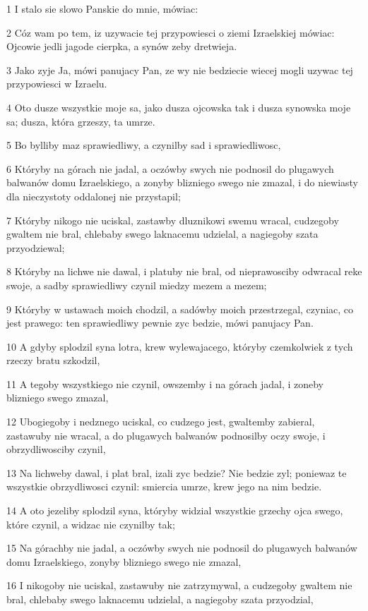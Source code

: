 \par 1 I stalo sie slowo Panskie do mnie, mówiac:
\par 2 Cóz wam po tem, iz uzywacie tej przypowiesci o ziemi Izraelskiej mówiac: Ojcowie jedli jagode cierpka, a synów zeby dretwieja.
\par 3 Jako zyje Ja, mówi panujacy Pan, ze wy nie bedziecie wiecej mogli uzywac tej przypowiesci w Izraelu.
\par 4 Oto dusze wszystkie moje sa, jako dusza ojcowska tak i dusza synowska moje sa; dusza, która grzeszy, ta umrze.
\par 5 Bo bylliby maz sprawiedliwy, a czynilby sad i sprawiedliwosc,
\par 6 Któryby na górach nie jadal, a oczówby swych nie podnosil do plugawych balwanów domu Izraelskiego, a zonyby blizniego swego nie zmazal, i do niewiasty dla nieczystoty oddalonej nie przystapil;
\par 7 Któryby nikogo nie uciskal, zastawby dluznikowi swemu wracal, cudzegoby gwaltem nie bral, chlebaby swego laknacemu udzielal, a nagiegoby szata przyodziewal;
\par 8 Któryby na lichwe nie dawal, i platuby nie bral, od nieprawosciby odwracal reke swoje, a sadby sprawiedliwy czynil miedzy mezem a mezem;
\par 9 Któryby w ustawach moich chodzil, a sadówby moich przestrzegal, czyniac, co jest prawego: ten sprawiedliwy pewnie zyc bedzie, mówi panujacy Pan.
\par 10 A gdyby splodzil syna lotra, krew wylewajacego, któryby czemkolwiek z tych rzeczy bratu szkodzil,
\par 11 A tegoby wszystkiego nie czynil, owszemby i na górach jadal, i zoneby blizniego swego zmazal,
\par 12 Ubogiegoby i nedznego uciskal, co cudzego jest, gwaltemby zabieral, zastawuby nie wracal, a do plugawych balwanów podnosilby oczy swoje, i obrzydliwosciby czynil,
\par 13 Na lichweby dawal, i plat bral, izali zyc bedzie? Nie bedzie zyl; poniewaz te wszystkie obrzydliwosci czynil: smiercia umrze, krew jego na nim bedzie.
\par 14 A oto jezeliby splodzil syna, któryby widzial wszystkie grzechy ojca swego, które czynil, a widzac nie czynilby tak;
\par 15 Na górachby nie jadal, a oczówby swych nie podnosil do plugawych balwanów domu Izraelskiego, zonyby blizniego swego nie zmazal,
\par 16 I nikogoby nie uciskal, zastawuby nie zatrzymywal, a cudzegoby gwaltem nie bral, chlebaby swego laknacemu udzielal, a nagiegoby szata przyodzial,
